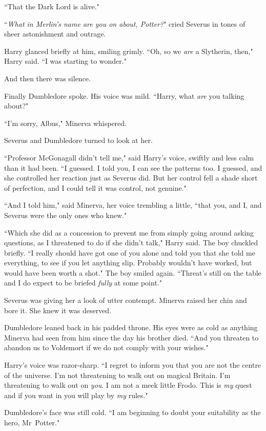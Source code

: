 ``That the Dark Lord is alive."

``\emph{What in Merlin's name are you on about, Potter?}" cried Severus in tones of sheer astonishment and outrage.

Harry glanced briefly at him, smiling grimly. ``Oh, so we \emph{are} a Slytherin, then," Harry said. ``I was starting to wonder."

And then there was silence.

Finally Dumbledore spoke. His voice was mild. ``Harry, what \emph{are} you talking about?"

``I'm sorry, Albus," Minerva whispered.

Severus and Dumbledore turned to look at her.

``Professor McGonagall didn't tell me," said Harry's voice, swiftly and less calm than it had been. ``I guessed. I told you, I can see the patterns too. I guessed, and she controlled her reaction just as Severus did. But her control fell a shade short of perfection, and I could tell it was control, not genuine."

``And I told him," said Minerva, her voice trembling a little, ``that you, and I, and Severus were the only ones who knew."

``Which she did as a concession to prevent me from simply going around asking questions, as I threatened to do if she didn't talk," Harry said. The boy chuckled briefly. ``I really should have got one of you alone and told you that she told me everything, to see if you let anything slip. Probably wouldn't have worked, but would have been worth a shot." The boy smiled again. ``Threat's still on the table and I do expect to be briefed \emph{fully} at some point."

Severus was giving her a look of utter contempt. Minerva raised her chin and bore it. She knew it was deserved.

Dumbledore leaned back in his padded throne. His eyes were as cold as anything Minerva had seen from him since the day his brother died. ``And you threaten to abandon us to Voldemort if we do not comply with your wishes."

Harry's voice was razor-sharp. ``I regret to inform you that you are not the centre of the universe. I'm not threatening to walk out on magical Britain. I'm threatening to walk out on \emph{you}. I am not a meek little Frodo. This is \emph{my} quest and if you want in you will play by \emph{my} rules."

Dumbledore's face was still cold. ``I am beginning to doubt your suitability as the hero, Mr~Potter."


